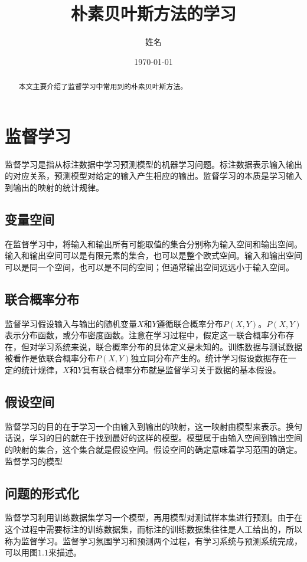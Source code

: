 \documentclass[UTF8]{ctexart}
\title{\heiti 朴素贝叶斯方法的学习}
\author{\kaishu 姓名}
\date{\today}
\begin{document}
\maketitle

\tableofcontents

\begin{abstract}
	本文主要介绍了监督学习中常用到的朴素贝叶斯方法。
\end{abstract}


\section{监督学习}
监督学习是指从标注数据中学习预测模型的机器学习问题。标注数据表示输入输出的对应关系，预测模型对给定的输入产生相应的输出。监督学习的本质是学习输入到输出的映射的统计规律。

\subsection{变量空间}
在监督学习中，将输入和输出所有可能取值的集合分别称为输入空间和输出空间。输入和输出空间可以是有限元素的集合，也可以是整个欧式空间。输入和输出空间可以是同一个空间，也可以是不同的空间；但通常输出空间远远小于输入空间。
\subsection{联合概率分布}
监督学习假设输入与输出的随机变量$X$和$Y$遵循联合概率分布$P(X,Y)$。$P(X,Y)$表示分布函数，或分布密度函数。注意在学习过程中，假定这一联合概率分布存在，但对学习系统来说，联合概率分布的具体定义是未知的。训练数据与测试数据被看作是依联合概率分布$P(X,Y)$独立同分布产生的。统计学习假设数据存在一定的统计规律，$X$和$Y$具有联合概率分布就是监督学习关于数据的基本假设。
\subsection{假设空间}
监督学习的目的在于学习一个由输入到输出的映射，这一映射由模型来表示。换句话说，学习的目的就在于找到最好的这样的模型。模型属于由输入空间到输出空间的映射的集合，这个集合就是假设空间。假设空间的确定意味着学习范围的确定。
监督学习的模型
\subsection{问题的形式化}
监督学习利用训练数据集学习一个模型，再用模型对测试样本集进行预测。由于在这个过程中需要标注的训练数据集，而标注的训练数据集往往是人工给出的，所以称为监督学习。监督学习氛围学习和预测两个过程，有学习系统与预测系统完成，可以用图$1.1$来描述。
\end{document}
